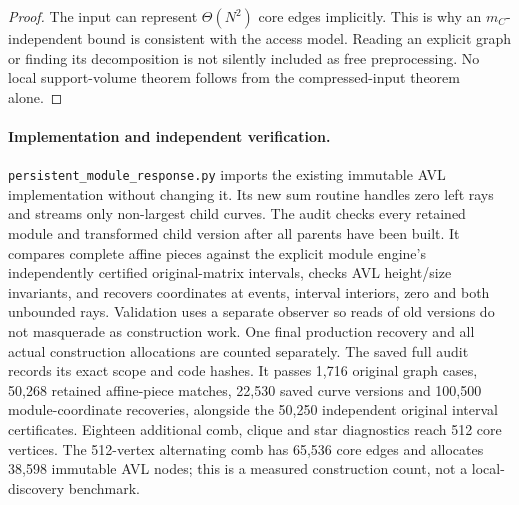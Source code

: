 \begin{proof}
The input can represent $\Theta(N^2)$ core edges implicitly. This is why
an $m_C$-independent bound is consistent with the access model. Reading an
explicit graph or finding its decomposition is not silently included as
free preprocessing. No local support-volume theorem follows from the
compressed-input theorem alone.
\end{proof}

\paragraph{Implementation and independent verification.}
\nolinkurl{persistent_module_response.py} imports the existing immutable
AVL implementation without changing it. Its new sum routine handles
zero left rays and streams only non-largest child curves. The audit checks
every retained module and transformed child version after all parents have
been built. It compares complete affine pieces against the explicit module
engine's independently certified original-matrix intervals, checks AVL
height/size invariants, and recovers coordinates at events, interval
interiors, zero and both unbounded rays. Validation uses a separate observer
so reads of old versions do not masquerade as construction work. One final
production recovery and all actual construction allocations are counted
separately. The saved full audit records its exact scope and code hashes.
It passes 1,716 original graph cases, 50,268 retained affine-piece matches,
22,530 saved curve versions and 100,500 module-coordinate recoveries,
alongside the 50,250 independent original interval certificates. Eighteen
additional comb, clique and star diagnostics reach 512 core vertices.
The 512-vertex alternating comb has 65,536 core edges and allocates
38,598 immutable AVL nodes; this is a measured construction count,
not a local-discovery benchmark.
